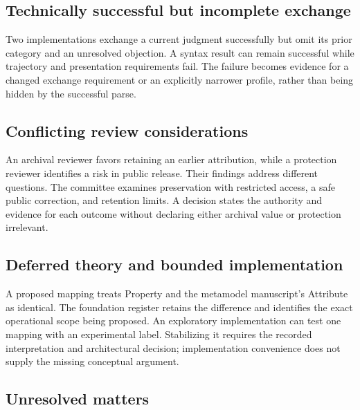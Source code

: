 \documentclass[11pt,a4paper]{article}
\begin{document}
\subsection{Technically successful but incomplete exchange}
Two implementations exchange a current judgment successfully but omit its prior category and an unresolved objection. A syntax result can remain successful while trajectory and presentation requirements fail. The failure becomes evidence for a changed exchange requirement or an explicitly narrower profile, rather than being hidden by the successful parse.

\subsection{Conflicting review considerations}
An archival reviewer favors retaining an earlier attribution, while a protection reviewer identifies a risk in public release. Their findings address different questions. The committee examines preservation with restricted access, a safe public correction, and retention limits. A decision states the authority and evidence for each outcome without declaring either archival value or protection irrelevant.

\subsection{Deferred theory and bounded implementation}
A proposed mapping treats Property and the metamodel manuscript's Attribute as identical. The foundation register retains the difference and identifies the exact operational scope being proposed. An exploratory implementation can test one mapping with an experimental label. Stabilizing it requires the recorded interpretation and architectural decision; implementation convenience does not supply the missing conceptual argument.

\subsection{Unresolved matters}
\end{document}
